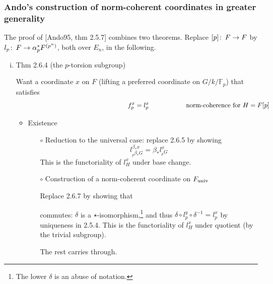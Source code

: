 \documentclass{rs}
\theoremstyle{definition}
\theoremstyle{remark}
\def\co{\colon\thinspace}
\newcommand{\mb}[1]{\mathbb{#1}}
\newcommand{\BF}{{\mb F}}
\newcommand{\univ}{{\rm univ}}
\newcommand{\A}{\alpha}
\newcommand{\B}{\beta}
\renewcommand{\d}{\delta}
\renewcommand{\=}{\approx}
\renewcommand{\-}{\sim}
\numberwithin{equation}{section}
\numberwithin{thm}{section}
\begin{document}
\subsubsection{Ando's construction of norm-coherent coordinates in greater generality}

The proof of [Ando95, thm 2.5.7] combines two theorems.  
Replace $[p] \co F \to F$ by $l_p \co F \to \A_p^* F^{(p^n)}$, both over $E_n$, in the following.  
\begin{enumerate}[(i)]
 \item Thm 2.6.4 (the $p$-torsion subgroup) 

 Want a coordinate $x$ on $F$ (lifting a preferred coordinate on $G/k/\BF_p$) that satisfies 
 \begin{equation}
  \label{nmcoh}
  \hskip 6cm f_p^x = l_p^x \hskip 2cm \text{norm-coherence for $H = F[p]$} 
 \end{equation}
 \begin{itemize}
  \item Existence 
  \begin{itemize}
   \item [$\circ$] Reduction to the universal case: replace 2.6.5 by showing 
   \[
    l_{_p\B_*G}^{\B_*x} = \B_* l_{_pG}^x 
   \]
   This is the functoriality of $l_H^x$ under base change.  

   \item [$\circ$] Construction of a norm-coherent coordinate on $F_\univ$ 

   Replace 2.6.7 by showing that 
   \begin{center}
   \end{center}
   commutes: $\d$ is a $\star$-isomorphism,\footnote{The lower $\d$ is an abuse of notation.  } 
   and thus $\d \circ l_p^y \circ \d^{-1} = l_p^x$ by uniqueness in 2.5.4.  
   This is the functoriality of $l_H^x$ under quotient (by the trivial subgroup).  

   The rest carries through.  


\end{itemize}
\end{itemize}
\end{enumerate}
\end{document}
